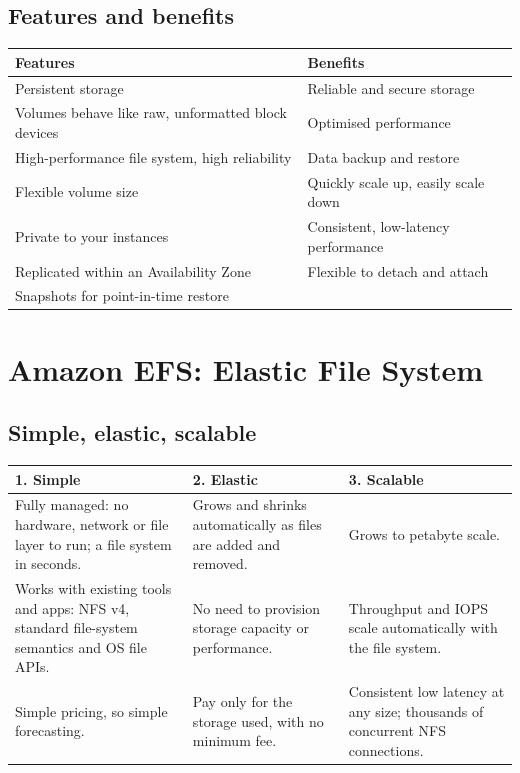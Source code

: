 \documentclass[11pt,a4paper]{article}
\begin{document}

\subsection{Features and benefits}

\begin{tabularx}{\textwidth}{@{}XX@{}}
\toprule
\rowcolor{tablehead}\textbf{Features} & \textbf{Benefits} \\
\midrule
Persistent storage & Reliable and secure storage \\
Volumes behave like raw, unformatted block devices & Optimised performance \\
High-performance file system, high reliability & Data backup and restore \\
Flexible volume size & Quickly scale up, easily scale down \\
Private to your instances & Consistent, low-latency performance \\
Replicated within an Availability Zone & Flexible to detach and attach \\
Snapshots for point-in-time restore & \\
\bottomrule
\end{tabularx}

\section{Amazon EFS: Elastic File System}


\subsection{Simple, elastic, scalable}

\begin{tabularx}{\textwidth}{@{}XXX@{}}
\toprule
\rowcolor{tablehead}\textbf{1. Simple} & \textbf{2. Elastic} & \textbf{3. Scalable} \\
\midrule
Fully managed: no hardware, network or file layer to run; a file system in seconds. &
Grows and shrinks automatically as files are added and removed. &
Grows to petabyte scale. \\
\addlinespace
Works with existing tools and apps: NFS v4, standard file-system semantics and OS file APIs. &
No need to provision storage capacity or performance. &
Throughput and IOPS scale automatically with the file system. \\
\addlinespace
Simple pricing, so simple forecasting. &
Pay only for the storage used, with no minimum fee. &
Consistent low latency at any size; thousands of concurrent NFS connections. \\
\bottomrule
\end{tabularx}
\end{document}
